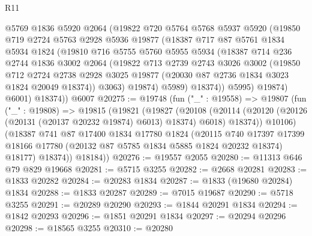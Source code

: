 \begin{lexlean}{R11}
\begin{coremodule}
            @5769
            @1836
            @5920
            @2064
            (@19822
              @720
              @5764
              @5768
              @5937
              @5920
              (@19850
                @719
                @2724
                @5763
                @2928
                @5936
                @19877
                (@18387
                  @717
                  @87
                  @5761
                  @1834
                  @5934
                  @1824
                  (@19810
                    @716
                    @5755
                    @5760
                    @5955
                    @5934
                    (@18387
                      @714
                      @236
                      @2744
                      @1836
                      @3002
                      @2064
                      (@19822
                        @713
                        @2739
                        @2743
                        @3026
                        @3002
                        (@19850
                          @712
                          @2724
                          @2738
                          @2928
                          @3025
                          @19877
                          (@20030 @87 @2736 @1834 @3023 @1824 @20049 @18374))
                        @3063)
                      @19874)
                    @5989)
                  @18374))
              @5995)
            @19874)
          @6001)
        @18374))
    @6007
@20275 := @19748
    (fun ("_" : @19558) =>
    @19807
      (fun ("_" : @19808) =>
      @19815
        (@19821
          (@19827
            (@20108
              (@20114 (@20120 (@20126 (@20131 (@20137 @20232 @19874) @6013) @18374) @6018) @18374))
            @10106)
          (@18387
            @741
            @87
            @17400
            @1834
            @17780
            @1824
            (@20115
              @740
              @17397
              @17399
              @18166
              @17780
              (@20132 @87 @5785 @1834 @5885 @1824 @20232 @18374)
              @18177)
            @18374))
        @18184))
@20276 := @19557 @2055
@20280 := @11313 @646 @79 @829 @19668
@20281 := @5715 @3255
@20282 := @2668 @20281
@20283 := @1833 @20282
@20284 := @20283 @1834
@20287 := @1833 (@19680 @20284) @1834
@20288 := @1833 @20287
@20289 := @7015 @19687
@20290 := @5718 @3255
@20291 := @20289 @20290
@20293 := @1844 @20291 @1834
@20294 := @1842 @20293
@20296 := @1851 @20291 @1834
@20297 := @20294 @20296
@20298 := @18565 @3255
@20310 := @20280

\end{coremodule}
\end{lexlean}
